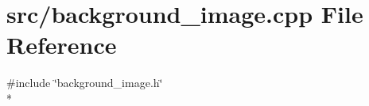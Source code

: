 \hypertarget{a00174}{\section{src/background\-\_\-image.cpp File Reference}
\label{a00174}
}
{\ttfamily \#include \char`\"{}background\-\_\-image.\-h\char`\"{}}\\*
